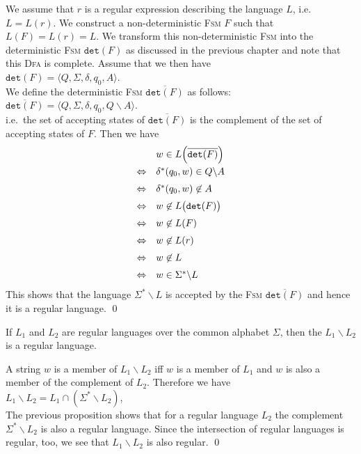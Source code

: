 \proofEng
We assume that $r$ is a regular expression describing the language $L$, i.e.~$L=L(r)$. 
We construct a non-deterministic \textsc{Fsm} $F$ such that $L(F) = L(r) = L$.  
We transform this non-deterministic \textsc{Fsm} into the deterministic \textsc{Fsm} $\mathtt{det}(F)$ as discussed
in the previous chapter and note that this \textsc{Dfa} is complete.
Assume that we then have
\\[0.2cm]
\hspace*{1.3cm} $\mathtt{det}(F) = \langle Q, \Sigma, \delta, q_0, A \rangle$.
\\[0.2cm]
We define the deterministic \textsc{Fsm} $\overline{\mathtt{det}(F)}$ as follows:
\\[0.2cm]
\hspace*{1.3cm} $\overline{\mathtt{det}(F)} = \langle Q, \Sigma, \delta, q_0, Q \backslash A \rangle$.
\\[0.2cm]
i.e.~the set of accepting states of $\overline{\mathtt{det}(F)}$ is the complement of the set of accepting
states of $F$.  Then we have
$$
\begin{array}[t]{cl}
                  & w \in L\Bigl(\overline{\mathtt{det}(F)}\Bigr)                      \\[0.2cm]
  \Leftrightarrow & \delta^*(q_0, w) \in Q \backslash A     \\[0.2cm]
  \Leftrightarrow & \delta^*(q_0, w) \not\in A \\[0.2cm]
  \Leftrightarrow & w \not\in L\bigl(\mathtt{det}(F)\bigr) \\[0.2cm]
  \Leftrightarrow & w \not\in L(F) \\[0.2cm]
  \Leftrightarrow & w \not\in L(r) \\[0.2cm]
  \Leftrightarrow & w \not\in L \\[0.2cm]
  \Leftrightarrow & w \in \Sigma^* \backslash L 
 \end{array}
$$
This shows that the language $\Sigma^* \backslash L$ is accepted by the \textsc{Fsm} $\overline{\mathtt{det}(F)}$
and hence it is a regular language.
 \qed

\begin{Corollary} \label{kor:mengendif}
  If $L_1$ and $L_2$ are regular languages over the common alphabet $\Sigma$, then the 
   $L_1 \backslash L_2$  is a regular language.
\end{Corollary}

\proofEng
A string $w$ is a member of $L_1 \backslash L_2$ iff $w$ is a member of $L_1$
and $w$ is also a member of the complement of $L_2$.  Therefore we have
\\[0.2cm]
\hspace*{1.3cm}
$L_1 \backslash L_2 = L_1 \cap (\Sigma^* \backslash L_2)$,
\\[0.2cm]
The previous proposition shows that for a regular language $L_2$ the complement
$\Sigma^* \backslash L_2$ is also a regular language.  Since the intersection of regular languages is regular,
too, we see that $L_1 \backslash L_2$ is also regular.
\qed
\vspace*{0.3cm}

